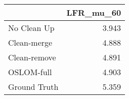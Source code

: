 \begin{tabular}{lr}
\toprule
{} & LFR_mu_60 \\
\midrule
No Clean Up  &     3.943 \\
Clean-merge  &     4.888 \\
Clean-remove &     4.891 \\
OSLOM-full   &     4.903 \\
Ground Truth &     5.359 \\
\bottomrule
\end{tabular}
